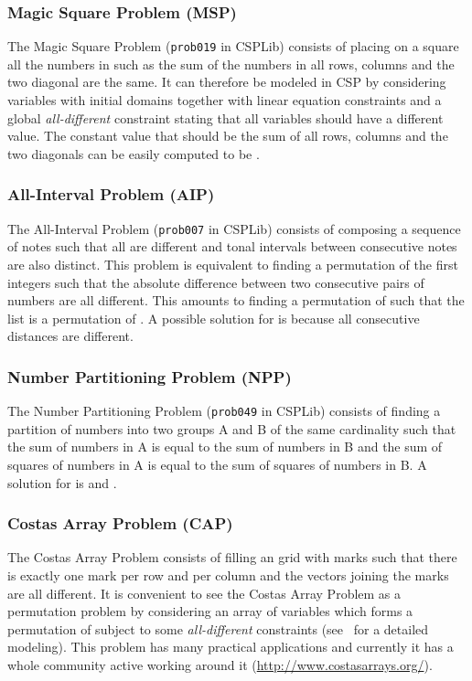 \documentclass{llncs}
\begin{document}
\subsubsection{Magic Square Problem (MSP)}
The Magic Square Problem (\texttt{prob019} in CSPLib) consists of
placing on a  square all the numbers in  such as the sum of the numbers in all rows, columns and the
two diagonal are the same.  It can therefore be modeled in CSP by
considering  variables with initial domains  together with linear equation constraints and a global
\emph{all-different} constraint stating that all variables should have
a different value. The constant value that should be the sum of all
rows, columns and the two diagonals can be easily computed to be
.

\subsubsection{All-Interval Problem (AIP)}
The All-Interval Problem (\texttt{prob007} in CSPLib) consists of
composing a sequence of  notes such that all are different and tonal
intervals between consecutive notes are also distinct. This problem is
equivalent to finding a permutation of the  first integers such that the
absolute difference between two consecutive pairs of numbers are all
different. This amounts to finding a permutation  of  such that the list  is a permutation of . A possible
solution for  is  because all consecutive
distances are different.

\subsubsection{Number Partitioning Problem (NPP)}
The Number Partitioning Problem (\texttt{prob049} in CSPLib) consists of
finding a partition of numbers  into two groups A
and B of the same cardinality such that the sum of numbers in A is
equal to the sum of numbers in B and the sum of squares of numbers in
A is equal to the sum of squares of numbers in B. A solution for  is  and .

\subsubsection{Costas Array Problem (CAP)}
The Costas Array Problem consists of filling an  grid with  marks such
that there is exactly one mark per row and per column and the 
vectors joining the marks are all different. It is convenient to see the
Costas Array Problem as a permutation problem by considering an array of 
variables  which forms a permutation of  subject to some \emph{all-different} constraints (see~\cite{diaz12} for a
detailed modeling). This problem has many practical applications and
currently it has a whole community active working around it
(\url{http://www.costasarrays.org/}).
\end{document}
